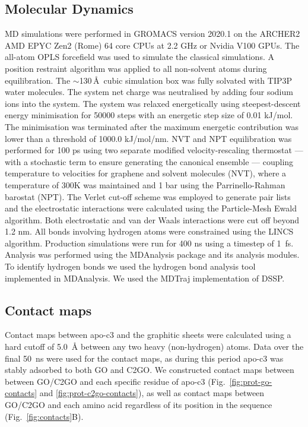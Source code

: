 \subsection{Molecular Dynamics}
%
MD simulations were performed in GROMACS version 2020.1 on the ARCHER2 AMD EPYC Zen2 (Rome) 64 core CPUs at 2.2 GHz or Nvidia V100 GPUs. The all-atom OPLS forcefield was used to simulate the classical simulations. A position restraint algorithm was applied to all non-solvent atoms during equilibration. The $\sim$130\,\AA\, cubic simulation box was fully solvated with TIP3P water molecules. The system net charge was neutralised by adding four sodium ions into the system. The system was relaxed energetically using steepest-descent energy minimisation for 50000 steps with an energetic step size of 0.01 kJ/mol. The minimisation was terminated after the maximum energetic contribution was lower than a threshold of 1000.0 kJ/mol/nm. NVT and NPT equilibration was performed for 100 ps using two separate modified velocity-rescaling thermostat --- with a stochastic term to ensure generating the canonical ensemble --- coupling temperature to velocities for graphene and solvent molecules (NVT),\cite{bussi2007canonical} where a temperature of 300K was maintained and 1 bar using the Parrinello-Rahman barostat (NPT). The Verlet cut-off scheme was employed to generate pair lists and the electrostatic interactions were calculated using the Particle-Mesh Ewald algorithm. Both electrostatic and van der Waals interactions were cut off beyond 1.2 nm. All bonds involving hydrogen atoms were constrained using the LINCS algorithm. Production simulations were run for 400 ns using a timestep of 1~fs. Analysis was performed using the MDAnalysis package \cite{mda, oliver_beckstein-proc-scipy-2016, Michaud-Agrawal-2011} and its analysis modules.\cite{araya2014characterization,smith2019interaction} To identify hydrogen bonds we used the hydrogen bond analysis tool \cite{smith2019interaction} implemented
in MDAnalysis. We used the MDTraj \cite{McGibbon2015MDTraj} implementation of DSSP. 

\subsection{Contact maps}
Contact maps between apo-c3 and the graphitic sheets were calculated using a hard cutoff of \SI{5.0}{\angstrom} between any two heavy (non-hydrogen) atoms. Data over the final \SI{50}{\nano\second} were used for the contact maps, as during this period apo-c3 was stably adsorbed to both GO and C2GO. We constructed contact maps between between GO/C2GO and each specific residue of apo-c3 (Fig.~\ref{fig:prot-go-contacts} and \ref{fig:prot-c2go-contacts}), as well as contact maps between GO/C2GO and each amino acid regardless of its position in the sequence (Fig.~\ref{fig:contacts}B).
%
